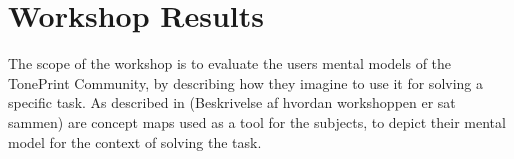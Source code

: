 \chapter{Workshop Results}
\label{Chap:WorkshopResults}

The scope of the workshop is to evaluate the users mental models of the TonePrint Community, by describing how they imagine to use it for solving a specific task. As described in (Beskrivelse af hvordan workshoppen er sat sammen) are concept maps used as a tool for the subjects, to depict their mental model for the context of solving the task. 